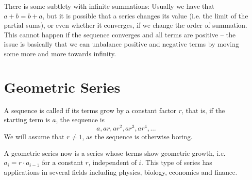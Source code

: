 \begin{note}
There is some subtlety with infinite summations: Usually we have that $a+b=b+a$, but it
is possible that a series changes its value (i.e. the limit of the partial sums), or
even whether it converges, if we change the order of summation.
This cannot happen if the sequence converges and all terms are positive -- the issue is
basically that we can unbalance positive and negative terms by moving some more and more
towards infinity.
\end{note}

\section{Geometric Series}

A sequence is called  if its terms grow by a constant
factor $r$, that is, if the starting term
is $a$, the sequence is 
\[
a, ar, ar^2, ar^3, ar^4,\ldots
\]
We will assume that $r\not=1$, as the sequence is otherwise boring.

%
%

A geometric series now is a series whose terms show geometric growth, i.e.
$a_i=r\cdot a_{i-1}$ for a constant $r$, independent of $i$.
This type of series has applications in several fields
including physics, biology, economics and finance.

